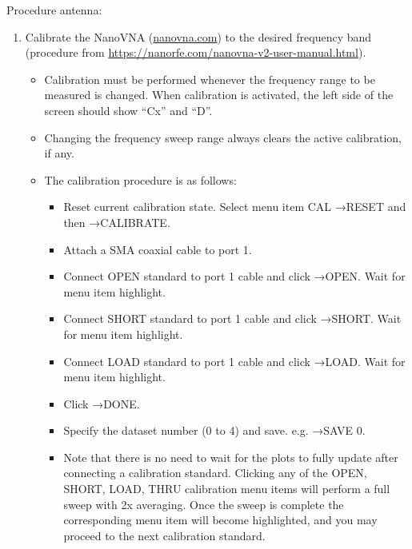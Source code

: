 Procedure antenna:
\begin{enumerate}
    \item Calibrate the NanoVNA (\url{nanovna.com}) to the desired frequency band (procedure from \url{https://nanorfe.com/nanovna-v2-user-manual.html}).
    \begin{itemize}
        \item Calibration must be performed whenever the frequency range to be measured is changed. When calibration is activated, the left side of the screen should show “Cx” and “D”.

        \item Changing the frequency sweep range always clears the active calibration, if any.

\item The calibration procedure is as follows:
\begin{itemize}
    \item Reset current calibration state. Select menu item CAL →RESET and then →CALIBRATE.
    \item Attach a SMA coaxial cable to port 1.
    \item Connect OPEN standard to port 1 cable and click →OPEN. Wait for menu item highlight.

\item Connect SHORT standard to port 1 cable and click →SHORT. Wait for menu item highlight.

\item Connect LOAD standard to port 1 cable and click →LOAD. Wait for menu item highlight.
\item Click →DONE.
\item Specify the dataset number (0 to 4) and save. e.g. →SAVE 0.
\item Note that there is no need to wait for the plots to fully update after connecting a calibration standard. Clicking any of the OPEN, SHORT, LOAD, THRU calibration menu items will perform a full sweep with 2x averaging. Once the sweep is complete the corresponding menu item will become highlighted, and you may proceed to the next calibration standard.
\end{itemize}



\end{itemize}
\end{enumerate}
